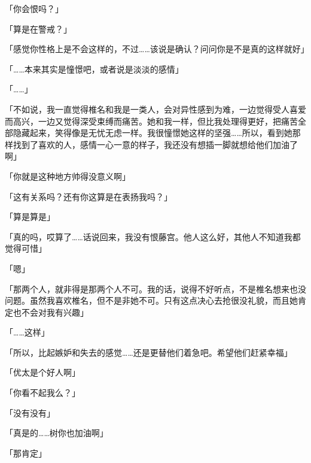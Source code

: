 「你会恨吗？」

「算是在警戒？」

「感觉你性格上是不会这样的，不过……该说是确认？问问你是不是真的这样就好」

「……本来其实是憧憬吧，或者说是淡淡的感情」

「……」

「不如说，我一直觉得椎名和我是一类人，会对异性感到为难，一边觉得受人喜爱而高兴，一边又觉得深受束缚而痛苦。她和我一样，但比我处理得更好，把痛苦全部隐藏起来，笑得像是无忧无虑一样。我很憧憬她这样的坚强……所以，看到她那样找到了喜欢的人，感情一心一意的样子，我还没有想插一脚就想给他们加油了啊」

「你就是这种地方帅得没意义啊」

「这有关系吗？还有你这算是在表扬我吗？」

「算是算是」

「真的吗，哎算了……话说回来，我没有恨藤宫。他人这么好，其他人不知道我都觉得可惜」

「嗯」

「那两个人，就非得是那两个人不可。我的话，说得不好听点，不是椎名想来也没问题。虽然我喜欢椎名，但不是非她不可。只有这点决心去抢很没礼貌，而且她肯定也不会对我有兴趣」

「……这样」

「所以，比起嫉妒和失去的感觉……还是更替他们着急吧。希望他们赶紧幸福」

「优太是个好人啊」

「你看不起我么？」

「没有没有」

「真是的……树你也加油啊」

「那肯定」
